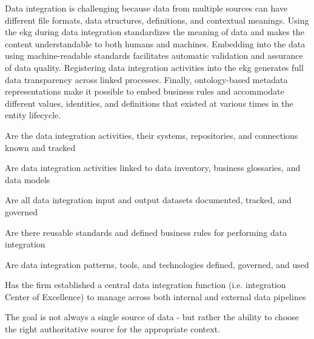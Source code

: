 %
%

\ekgmmCapabilitySectionContributionToEnterprise

Data integration is challenging because data from multiple sources can have different file formats, data structures,
definitions, and contextual meanings.
Using the \gls{ekg} during data integration standardizes the meaning of data and makes the content understandable
to both humans and machines.
Embedding  into the data using machine-readable standards facilitates
automatic validation and assurance of data quality.
Registering data integration activities into the \gls{ekg} generates full data transparency across
linked processes.
Finally, ontology-based metadata representations make it possible to embed business rules and accommodate
different values, identities, and definitions that existed at various times in the entity lifecycle.

\ekgmmCapabilitySectionDimensions

\begin{core-questions}

  \item [\thesection.1] Are the data integration activities, their systems, repositories, and connections
                        known and tracked
  \item [\thesection.2] Are data integration activities linked to data inventory, business glossaries, and data models
  \item [\thesection.3] Are all data integration input and output datasets documented, tracked, and governed
  \item [\thesection.4] Are there reusable standards and defined business rules for performing data integration
  \item [\thesection.5] Are data integration patterns, tools, and technologies defined, governed, and used
  \item [\thesection.6] Has the firm established a central data integration function
                        (i.e. integration Center of Excellence) to manage  across both
                        internal and external data pipelines
\end{core-questions}

\ekgmmCapabilitySectionDimensions

The goal is not always a single source of data - but rather the ability to choose the right authoritative source
for the appropriate context.

